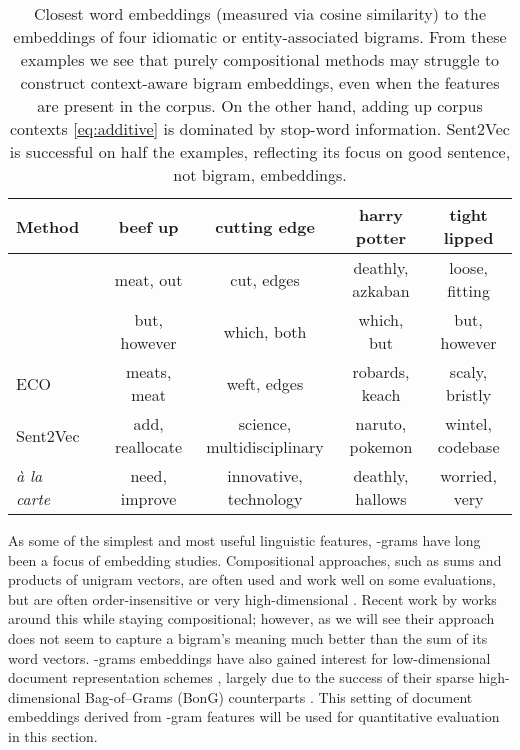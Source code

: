 \documentclass[11pt,a4paper]{article}
\begin{document}
\begin{table*}[t!]
	\centering
	\begin{threeparttable}
		\begin{tabular}{lccccc}
			Method && beef up & cutting edge & harry potter & tight lipped \\
			\toprule
			 && meat, out & cut, edges & deathly, azkaban & loose, fitting \\
			 && but, however & which, both & which, but & but, however \\
			ECO && meats, meat & weft, edges & robards, keach & scaly, bristly \\
			Sent2Vec && add, reallocate & science, multidisciplinary & naruto, pokemon & wintel, codebase \\
			{\em\`a la carte} && need, improve & innovative, technology & deathly, hallows & worried, very \\
			\bottomrule
		\end{tabular}
	\end{threeparttable}
	\caption{\label{tbl:bigrams}
		Closest word embeddings (measured via cosine similarity) to the embeddings of four idiomatic or entity-associated bigrams.
		From these examples we see that purely compositional methods may struggle to construct context-aware bigram embeddings, even when the features are present in the corpus.
		On the other hand, adding up corpus contexts \eqref{eq:additive} is dominated by stop-word information.
		Sent2Vec is successful on half the examples, reflecting its focus on good sentence, not bigram, embeddings.
	}
\end{table*}
 
As some of the simplest and most useful linguistic features, -grams have long been a focus of embedding studies.
Compositional approaches, such as sums and products of unigram vectors, are often used and work well on some evaluations, but are often order-insensitive or very high-dimensional \cite{Mitchell:10}.
Recent work by \citet{Poliak:17} works around this while staying compositional;
however, as we will see their approach does not seem to capture a bigram's meaning much better than the sum of its word vectors.
-grams embeddings have also gained interest for low-dimensional document representation schemes \cite{Hill:16,Pagliardini:18,Arora:18a}, largely due to the success of their sparse high-dimensional Bag-of--Grams (BonG) counterparts \cite{Wang:12}.
This setting of document embeddings derived from -gram features will be used for quantitative evaluation in this section.
\end{document}
